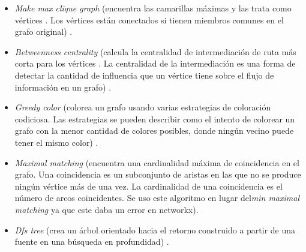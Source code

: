 \documentclass{article}
\begin{document}
\begin{itemize}
 \item\textit{Make max clique graph} (encuentra las camarillas máximas y las trata como vértices . Los vértices  están conectados si tienen miembros comunes en el grafo original)  \cite{mc}.  
 \item\textit{Betweenness centrality} (calcula la centralidad de intermediación de ruta más corta para los vértices . La centralidad de la intermediación es una forma de detectar la cantidad de influencia que un vértice tiene sobre el flujo de información en un grafo) \cite{bct}.
	\item\textit{Greedy color} (colorea un grafo usando varias estrategias de coloración codiciosa. Las estrategias se pueden describir como el intento de colorear un grafo con la menor cantidad de colores posibles, donde ningún vecino puede tener el mismo color) \cite{gc}.
	\item\textit{Maximal matching} (encuentra una cardinalidad máxima de coincidencia en el grafo. Una coincidencia es un subconjunto de aristas en las que no se produce ningún vértice más de una vez. La cardinalidad de una coincidencia es el número de arcos coincidentes. Se uso este algoritmo en lugar del\textit{min maximal matching} ya que este daba un error en networkx)\cite{mm}.
	\item\textit{Dfs tree} (crea un árbol orientado hacia el retorno construido a partir de una fuente en una búsqueda en profundidad) \cite{dt}.
\end{itemize}
\begin{center}

\end{center}
\end{document}
